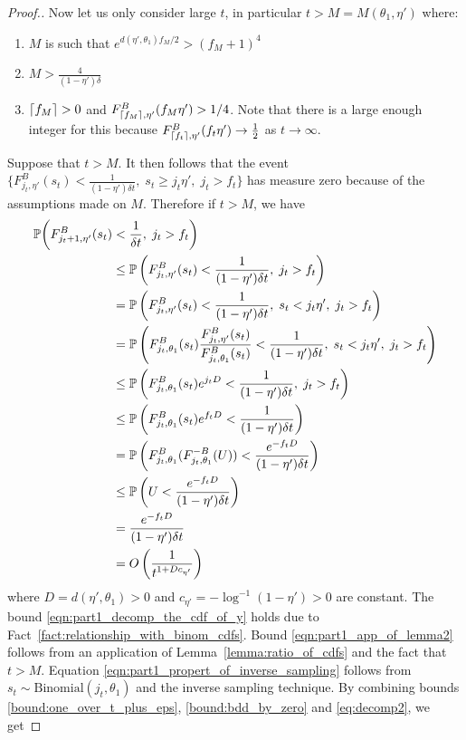 \begin{proof}[Proof.]
	Now let us only consider large $t$, in particular $t > M = M(\theta_1, \eta')$ where:
	\begin{enumerate}
		\item $M$ is such that $e^{d(\eta', \theta_1)f_{M}/2} > (f_M + 1)^4$
		\item $M > \frac{4}{(1-\eta')\delta }$
		\item $\ceil{f_M} > 0$ and $F^B_{\ceil{f_M},\eta'}(f_M \eta') > 1/4$. Note that there is a large enough integer for this because $F^B_{\ceil{f_t},\eta'}(f_t \eta') \to \frac{1}{2}$ as $t \to \infty$.
	\end{enumerate} 
	Suppose that $t > M$. It then follows that the event $\{F^B_{j_t, \eta'}(s_t) < \frac{1}{(1-\eta')\delta t},\; s_t \ge j_t \eta', \; j_t > f_t\}$ has measure zero because of the assumptions made on $M$. Therefore if $t > M$, we have
	\begin{align}
	\mathbb{P}\bigg(F^B_{j_t+1,  \eta'}(s_t) &< \frac{1}{\delta t }  , \; j_t > f_t \bigg) \nonumber \\
	& \le \P{F^B_{j_t,  \eta'}(s_t) < \frac{1}{(1-\eta')\delta t}, \; j_t > f_t} \label{eqn:part1_decomp_the_cdf_of_y} \\ 
	& = \P{F^B_{j_t,  \eta'}(s_t) < \frac{1}{(1-\eta')\delta t}, \; s_t < j_t \eta', \; j_t > f_t} \nonumber \\ 
	& =  \P{F^B_{j_t,\theta_1}(s_t) \frac{F^B_{j_t,\eta'}(s_t)}{F^B_{j_t,\theta_1}(s_t)} < \frac{1}{(1-\eta')\delta  t}, \;s_t < j_t \eta', \; j_t > f_t} \nonumber \\
	& \le  \P{F_{j_t,\theta_1}^B(s_t)  e^{j_t D} < \frac{1}{(1-\eta')\delta  t} , \; j_t > f_t} \label{eqn:part1_app_of_lemma2} \\
	& \le  \P{F_{j_t,\theta_1}^B(s_t) e^{f_t D} < \frac{1}{(1-\eta')\delta  t}} \nonumber \\
	& =  \P{F_{j_t,\theta_1}^B(F^{-B}_{j_t,\theta_1}(U)) < \frac{e^{-f_t D}}{(1-\eta')\delta  t} } \label{eqn:part1_propert_of_inverse_sampling}\\
	& \le  \P{U < \frac{e^{-f_t D}}{(1-\eta')\delta  t} } \nonumber \\  
	& =  \frac{e^{-f_t D}}{(1-\eta')\delta  t} \nonumber  \nonumber\\
	& = O\left( \frac{1}{t^{1+Dc_{\eta'}}} \right)  \label{bound:one_over_t_plus_eps} 
	\end{align}
	where $D = d(\eta',\theta_1) > 0$ and $c_{\eta'} = -\log^{-1}(1-\eta') > 0$ are constant. The bound \eqref{eqn:part1_decomp_the_cdf_of_y} holds due to Fact~\eqref{fact:relationship_with_binom_cdfs}. Bound \eqref{eqn:part1_app_of_lemma2} follows from an application of Lemma~\ref{lemma:ratio_of_cdfs} and the fact that $t > M$. Equation \eqref{eqn:part1_propert_of_inverse_sampling} follows from $s_t \sim \text{Binomial}(j_t, \theta_1)$ and the inverse sampling technique. By combining bounds \eqref{bound:one_over_t_plus_eps}, \eqref{bound:bdd_by_zero} and \eqref{eq:decomp2}, we get

\end{proof}
